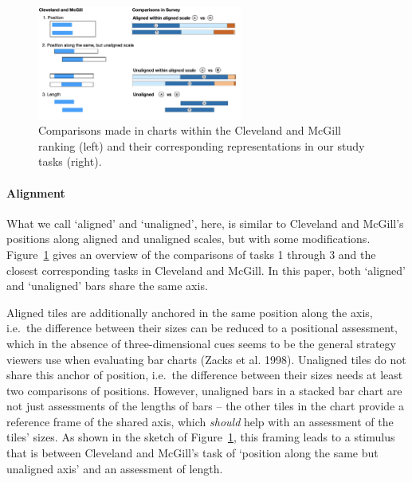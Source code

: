 \documentclass[
]{jds}
\let\oldparagraph\paragraph
\renewcommand{\paragraph}[1]{\oldparagraph{#1}\mbox{}}
\begin{document}
\begin{figure}[hbt]

{\centering \includegraphics[width=0.6\textwidth,height=\textheight]{images/sketch-tasks.png}

}

\caption{\label{fig-tasks-explain}Comparisons made in charts within the
Cleveland and McGill ranking (left) and their corresponding
representations in our study tasks (right).}

\end{figure}

\hypertarget{alignment}{%
\paragraph{Alignment}\label{alignment}}

What we call `aligned' and `unaligned', here, is similar to Cleveland
and McGill's positions along aligned and unaligned scales, but with some
modifications. Figure~\ref{fig-tasks-explain} gives an overview of the
comparisons of tasks 1 through 3 and the closest corresponding tasks in
Cleveland and McGill. In this paper, both `aligned' and `unaligned' bars
share the same axis.

Aligned tiles are additionally anchored in the same position along the
axis, i.e.~the difference between their sizes can be reduced to a
positional assessment, which in the absence of three-dimensional cues
seems to be the general strategy viewers use when evaluating bar charts
(Zacks et al. 1998). Unaligned tiles do not share this anchor of
position, i.e.~the difference between their sizes needs at least two
comparisons of positions. However, unaligned bars in a stacked bar chart
are not just assessments of the lengths of bars -- the other tiles in
the chart provide a reference frame of the shared axis, which
\emph{should} help with an assessment of the tiles' sizes. As shown in
the sketch of Figure~\ref{fig-tasks-explain}, this framing leads to a
stimulus that is between Cleveland and McGill's task of `position along
the same but unaligned axis' and an assessment of length.
\end{document}
